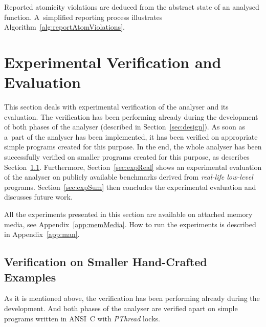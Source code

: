 Reported atomicity violations are deduced from the abstract state of
an analysed function. A~simplified reporting process illustrates
Algorithm~\ref{alg:reportAtomViolations}.

\begin{algorithm}[hbt]



    \caption{%
        Reporting of atomicity violations from the abstract state of
        an analysed function
    }
    \label{alg:reportAtomViolations}
\end{algorithm}


\section{Experimental Verification and Evaluation}
\label{sec:exp}

This section deals with experimental verification of the analyser
and its evaluation. The verification has been performing already during
the development of both phases of the analyser (described in
Section~\ref{sec:design}). As soon as a~part of the analyser has been
implemented, it has been verified on appropriate simple programs created
for this purpose. In the end, the whole analyser has been successfully
verified on smaller programs created for this purpose, as describes
Section~\ref{sec:expPurpos}. Furthermore, Section~\ref{sec:expReal}
shows an experimental evaluation of the analyser on publicly available
benchmarks derived from \emph{real-life low-level} programs.
Section~\ref{sec:expSum} then concludes the experimental evaluation
and discusses future work.

All the experiments presented in this section are available on
attached memory media, see Appendix~\ref{app:memMedia}. How to run
the experiments is described in Appendix~\ref{app:man}.


\subsection{Verification on Smaller Hand-Crafted Examples}
\label{sec:expPurpos}

As it is mentioned above, the verification has been performing already
during the development. And both phases of the analyser are verified
apart on simple programs written in ANSI~C with \emph{PThread} locks.

